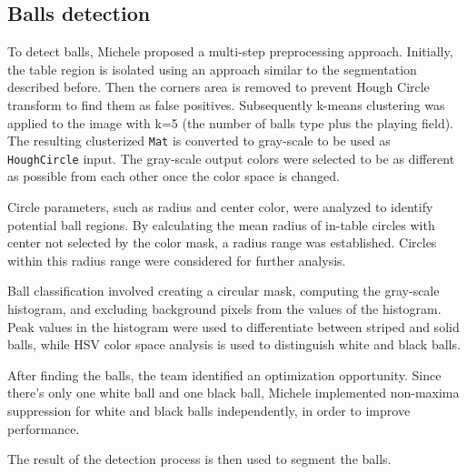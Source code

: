 \subsection{Balls detection}
To detect balls, Michele proposed a multi-step preprocessing approach. Initially, the table region is isolated using an approach similar to the segmentation described before. Then the corners area is removed to prevent Hough Circle transform to find them as false positives. Subsequently k-means clustering was applied to the image with k=5 (the number of balls type plus the playing field). The resulting clusterized \texttt{Mat} is converted to gray-scale to be used as \texttt{HoughCircle} input. The gray-scale output colors were selected to be as different as possible from each other once the color space is changed.

Circle parameters, such as radius and center color, were analyzed to identify potential ball regions. By calculating the mean radius of in-table circles with center not selected by the color mask, a radius range was established. Circles within this radius range were considered for further analysis.

Ball classification involved creating a circular mask, computing the gray-scale histogram, and excluding background pixels from the values of the histogram. Peak values in the histogram were used to differentiate between striped and solid balls, while HSV color space analysis is used to distinguish white and black balls.

After finding the balls, the team identified an optimization opportunity. Since there's only one white ball and one black ball, Michele implemented non-maxima suppression for white and black balls independently, in order to improve performance.

The result of the detection process is then used to segment the balls.
